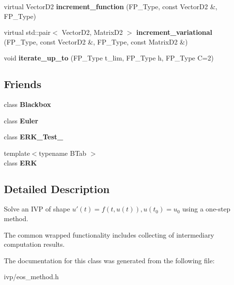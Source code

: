\begin{DoxyCompactItemize}
virtual Vector\+D2 {\bfseries increment\+\_\+function} (F\+P\+\_\+\+Type, const Vector\+D2 \&, F\+P\+\_\+\+Type)
\item 
\mbox{\label{classOneStepMethod_aa599262a475dd7f837600093a00b70d3}} 
virtual std\+::pair$<$ Vector\+D2, Matrix\+D2 $>$ {\bfseries increment\+\_\+variational} (F\+P\+\_\+\+Type, const Vector\+D2 \&, F\+P\+\_\+\+Type, const Matrix\+D2 \&)
\item 
\mbox{\label{classOneStepMethod_adf00efa88d6fb3d1e9f7b3024375a0b4}} 
void {\bfseries iterate\+\_\+up\+\_\+to} (F\+P\+\_\+\+Type t\+\_\+lim, F\+P\+\_\+\+Type h, F\+P\+\_\+\+Type C=2)
\end{DoxyCompactItemize}
\subsection*{Friends}
\begin{DoxyCompactItemize}
\item 
\mbox{\label{classOneStepMethod_af3aa570b8e278b935d7dc84d2774ccb7}} 
class {\bfseries Blackbox}
\item 
\mbox{\label{classOneStepMethod_a9e8c94ebada889fba517c82fc3408d32}} 
class {\bfseries Euler}
\item 
\mbox{\label{classOneStepMethod_a146a867264afb1cda48fa788ceca1f13}} 
class {\bfseries E\+R\+K\+\_\+\+Test\+\_}
\item 
\mbox{\label{classOneStepMethod_a55adbdc4c0fea0e770e4d18b0379d490}} 
{\footnotesize template$<$typename B\+Tab $>$ }\\class {\bfseries E\+RK}
\end{DoxyCompactItemize}


\subsection{Detailed Description}
Solve an I\+VP of shape $u'(t) = f(t, u(t)), u(t_0) = u_0$ using a one-\/step method. 

The common wrapped functionality includes collecting of intermediary computation results. 

The documentation for this class was generated from the following file\+:\begin{DoxyCompactItemize}
\item 
ivp/eos\+\_\+method.\+h\end{DoxyCompactItemize}
